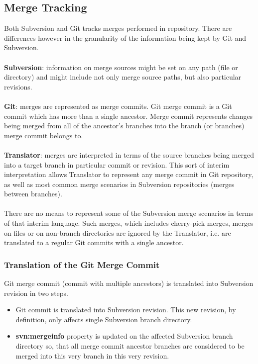 \renewcommand{\figurename}{Diagram}
\subsection{Merge Tracking}

Both Subversion and Git tracks merges performed in repository. There are differences however in 
the granularity of the information being kept by Git and Subversion.
\\\\
\textbf{Subversion}: information on merge sources might be set on any path (file or directory) and might include not only
merge source paths, but also particular revisions.
\\\\
\textbf{Git}: merges are represented as merge commits. Git merge commit is a Git commit which has more than a single 
ancestor. Merge commit represents changes being merged from all of the ancestor's branches into the branch (or branches)
merge commit belongs to.
\\\\
\textbf{Translator}: merges are interpreted in terms of the source branches being merged into a 
target branch in particular commit or revision. This sort of interim interpretation allows Translator
to represent any merge commit in Git repository, as well as most common merge scenarios in Subversion repositories (merges
between branches).
\\\\
There are no means to represent some of the Subversion merge scenarios in terms of that interim language.
Such merges, which includes cherry-pick merges, merges on files or on non-branch directories are ignored by the Translator,
i.e. are translated to a regular Git commits with a single ancestor.

\subsubsection{Translation of the Git Merge Commit}

Git merge commit (commit with multiple ancestors) is translated into Subversion revision in two steps.
\begin{itemize}
\item Git commit is translated into Subversion revision. This new revision, by definition, only affects single Subversion branch directory.
\item \textbf{svn:mergeinfo} property is updated on the affected Subversion branch directory so, that all merge
commit ancestor branches are considered to be merged into this very branch in this very revision.
\end{itemize}

